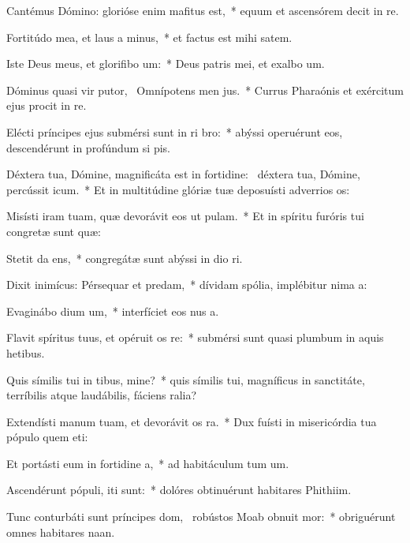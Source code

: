 \item Cantémus Dómino: glorióse enim mafitus est,~* equum et ascensórem decit in re.
\item Fortitúdo mea, et laus a minus,~* et factus est mihi  satem.
\item Iste Deus meus, et glorifibo um:~* Deus patris mei, et exalbo um.
\item Dóminus quasi vir putor,~\pscross{} Omnípotens men jus.~* Currus Pharaónis et exércitum ejus procit in re.
\item Elécti príncipes ejus submérsi sunt in ri bro:~* abýssi operuérunt eos, descendérunt in profúndum si pis.
\item Déxtera tua, Dómine, magnificáta est in fortidine:~\pscross{} déxtera tua, Dómine, percússit icum.~* Et in multitúdine glóriæ tuæ deposuísti adverrios os:
\item Misísti iram tuam, quæ devorávit eos ut pulam.~* Et in spíritu furóris tui congretæ sunt quæ:
\item Stetit da ens,~* congregátæ sunt abýssi in dio ri.
\item Dixit inimícus: Pérsequar et predam,~* dívidam spólia, implébitur nima a:
\item Evaginábo dium um,~* interfíciet eos nus a.
\item Flavit spíritus tuus, et opéruit os re:~* submérsi sunt quasi plumbum in aquis hetibus.
\item Quis símilis tui in tibus, mine?~* quis símilis tui, magníficus in sanctitáte, terríbilis atque laudábilis, fáciens ralia?
\item Extendísti manum tuam, et devorávit os ra.~* Dux fuísti in misericórdia tua pópulo quem eti:
\item Et portásti eum in fortidine a,~* ad habitáculum tum um.
\item Ascendérunt pópuli,  iti sunt:~* dolóres obtinuérunt habitares Phithiim.
\item Tunc conturbáti sunt príncipes dom,~\pscross{} robústos Moab obnuit mor:~* obriguérunt omnes habitares naan.
